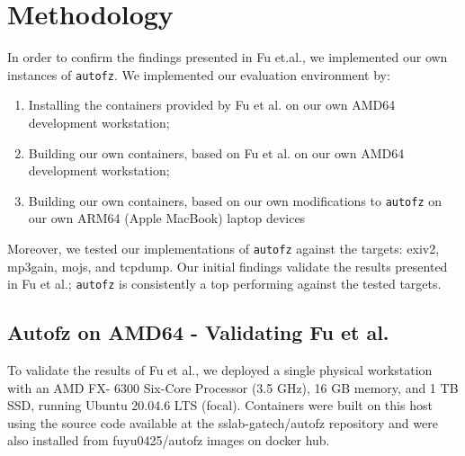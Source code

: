 \section{Methodology}

\newcommand{\pdiff}{diff_{peak}}

In order to confirm the findings presented in Fu et.al.\cite{fu_autofz_2023}, we implemented our 
own instances of \texttt{autofz}. We implemented our evaluation environment by:

\begin{enumerate}
    \item Installing the containers provided by Fu et al. \cite{fu_autofz_2023} on our own
    AMD64 development workstation;
    \item Building our own containers, based on Fu et al. \cite{fu_autofz_2023} on our own
    AMD64 development workstation;
    \item Building our own containers, based on our own modifications to \texttt{autofz} on our own 
    ARM64 (Apple MacBook) laptop devices
\end{enumerate}

Moreover, we tested our implementations of \texttt{autofz} against the targets: exiv2, mp3gain, mojs, and 
tcpdump. Our initial findings validate the results presented in Fu et al.; \texttt{autofz} 
is consistently a top performing against the tested targets.

\subsection{Autofz on AMD64 - Validating Fu et al.\cite{fu_autofz_2023}}

To validate the results of Fu et al., we deployed a single physical workstation with 
an AMD FX\texttrademark - 6300 Six-Core Processor (3.5 GHz), 16 GB memory, and 1 TB 
SSD, running Ubuntu 20.04.6 LTS (focal). Containers were built on this host using 
the source code available at the sslab-gatech/autofz repository \cite{noauthor_sslab-gatechautofz_2024} 
and were also installed from fuyu0425/autofz images on docker hub\cite{noauthor_fuyu0425autofz_nodate}.


